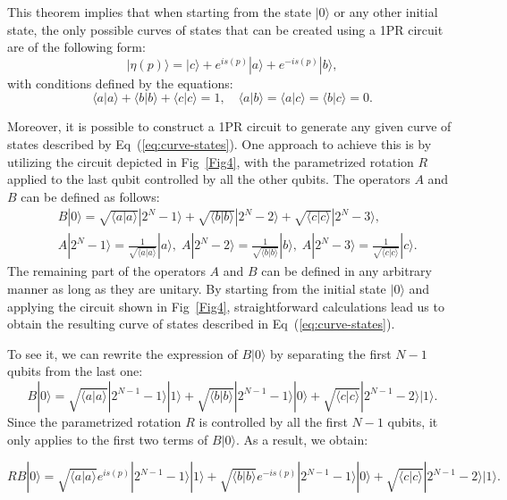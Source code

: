 \documentclass[10pt,letterpaper]{article} %
\newcommand{\fref}[1]{Fig~\ref{#1}}
\newcommand{\eref}[1]{Eq~(\ref{#1})}
\begin{document}
This theorem implies that when starting from the state $|0\rangle$ 
or any other initial state, the only possible curves of states that can be 
created using a 1PR circuit are of the following form:
\begin{equation}
|\eta(p)\rangle = |c\rangle + e^{is(p)}|a\rangle + e^{-is(p)} |b\rangle,
\label{eq:curve-states}
\end{equation}
with conditions defined by the equations: 
\begin{equation}
\langle a| a\rangle + \langle b| b\rangle + \langle c| c\rangle = 1,  \quad
\langle a |b\rangle =
\langle a |c\rangle =
\langle b |c\rangle = 0.
\label{eq:conditions-vecs}
\end{equation}

Moreover, it is possible to construct a 1PR circuit to generate any given curve of 
states described by \eref{eq:curve-states}. 
One approach to achieve this is by utilizing the circuit 
depicted in \fref{Fig4}, 
with the parametrized rotation $R$ applied to the last qubit controlled by all the 
other qubits. The operators $A$ and $B$ can be defined as follows:
\begin{align*}
&B|0\rangle = \sqrt{\langle a | a \rangle} |2^{N}-1 \rangle + \sqrt{\langle b | b \rangle} |2^{N}-2\rangle + \sqrt{\langle c |c \rangle} |2^N-3\rangle, \\
&A|2^N-1 \rangle = \frac{1}{\sqrt{\langle a | a \rangle}} |a\rangle,\; A|2^{N}-2\rangle = \frac{1}{\sqrt{\langle b | b \rangle}}|b\rangle, \; A|2^{N}-3\rangle = \frac{1}{\sqrt{\langle c | c \rangle}}|c\rangle.
\end{align*}
The remaining part of the operators $A$ and $B$ can be defined
in any arbitrary manner as long as they are unitary.
By starting from the initial state $|0\rangle$ and 
applying the circuit shown in \fref{Fig4}, straightforward calculations 
lead us to obtain the resulting curve of states described in \eref{eq:curve-states}.

To see it, we can rewrite the expression of $B|0\rangle$ by 
separating the first $N-1$ qubits from the last one:
$$B|0\rangle = \sqrt{\langle a | a \rangle} |2^{N-1}-1\rangle |1\rangle + \sqrt{\langle b | b \rangle} |2^{N-1}-1\rangle |0\rangle + \sqrt{\langle c | c \rangle} |2^{N-1}-2\rangle |1\rangle.$$
Since the parametrized rotation $R$ is controlled by all the first $N-1$ qubits, it only applies to the first two terms of $B|0\rangle$. As a result, we obtain:

$$
RB|0\rangle =\sqrt{\langle a | a \rangle} e^{is(p)} |2^{N-1}-1\rangle |1\rangle + \sqrt{\langle b | b \rangle} e^{-is(p)} |2^{N-1}-1\rangle |0\rangle + \sqrt{\langle c | c \rangle} |2^{N-1}-2\rangle |1\rangle.
$$
\end{document}
